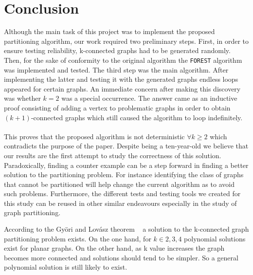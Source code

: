 
\section{Conclusion}

Although the main task of this project was to implement the proposed partitioning algorithm, our work required two preliminary steps. First, in order to ensure testing reliability, k-connected graphs had to be generated randomly. Then, for the sake of conformity to the original algorithm the \verb!FOREST! algorithm was implemented and tested. The third step was the main algorithm. After implementing the latter and testing it with the generated graphs endless loops appeared for certain graphs. An immediate concern after making this discovery was whether $k=2$ was a special occurrence. The answer came as an inductive proof consisting of adding a vertex to problematic graphs in order to obtain $(k+1)$-connected graphs which still caused the algorithm to loop indefinitely. 

\paragraph{}

This proves that the proposed algorithm is not deterministic $\forall k \geq 2$ which contradicts the purpose of the paper. Despite being a ten-year-old we believe that our results are the first attempt to study the correctness of this solution. Paradoxically, finding a counter example can be a step forward in finding a better solution to the partitioning problem. For instance identifying the class of graphs that cannot be partitioned will help change the current algorithm as to avoid such problems. Furthermore, the different tests and testing tools we created for this study can be reused in other similar endeavours especially in the study of graph partitioning.

\pragraph{}

According to the Györi and Lovász theorem ~\cite{GE78} a solution to the k-connected graph partitioning problem exists. On the one hand, for $k \in {2, 3, 4}$ polynomial solutions exist for planar graphs. On the other hand, as k value increases the graph becomes more connected and solutions should tend to be simpler. So a general polynomial solution is still likely to exist. 

